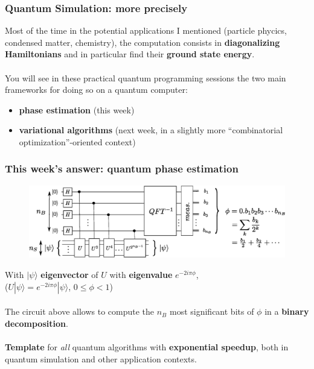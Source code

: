 \documentclass{beamer}
\begin{document}
\begin{frame}
\frametitle{Quantum Simulation: more precisely}

Most of the time in the potential applications I mentioned (particle phycics, condensed matter, chemistry),
the computation consists in \textbf{diagonalizing Hamiltonians} and in particular find their \textbf{ground
state energy}.\\~\\
You will see in these practical quantum programming sessions the two main frameworks for doing so on a quantum computer:
\begin{itemize}
\item \textbf{phase estimation} (this week)
\item \textbf{variational algorithms} (next week, in a slightly more ``combinatorial optimization''-oriented context)
\end{itemize}

\end{frame}



\begin{frame}
\frametitle{This week's answer: quantum phase estimation}
\begin{center}
\begin{figure}
\includegraphics[width=\textwidth]{quantum_phase_estimation.eps}
\end{figure}
\end{center}

With $|\psi\rangle$ \textbf{eigenvector} of $U$ with \textbf{eigenvalue} $e^{-2i\pi\phi}$,\\
 ($U|\psi\rangle = e^{-2i\pi\phi}|\psi\rangle$, $0\leq\phi<1$)\\~\\
The circuit above allows to compute the $n_{B}$ most significant bits of $\phi$ in a \textbf{binary
decomposition}.\\~\\

\textbf{Template} for \emph{all} quantum algorithms with \textbf{exponential speedup}, both in quantum simulation
and other application contexts.\\
\end{frame}
\end{document}
